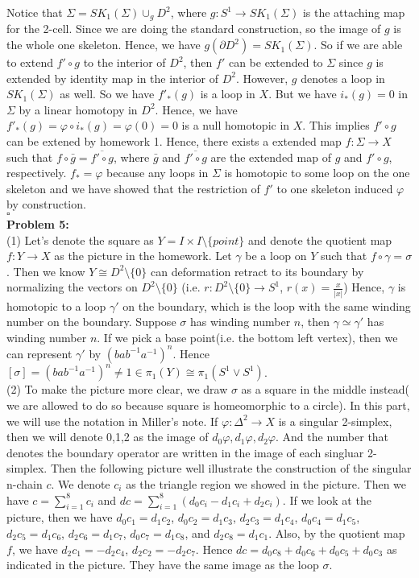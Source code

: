\documentclass[12pt]{amsart}
\begin{document}
Notice that $\Sigma=SK_1(\Sigma)\cup_g D^2$, where $g:S^1\to SK_1(\Sigma)$ is the attaching map for the 2-cell. Since we are doing the standard construction, so the image of $g$ is the whole one skeleton. Hence, we have $g(\partial D^2)=SK_1(\Sigma)$. So if we are able to extend $f'\circ g$ to the interior of $D^2$, then $f'$ can be extended to $\Sigma$ since $g$ is extended by identity map in the interior of $D^2$. However, $g$ denotes a loop in $SK_1(\Sigma)$ as well. So we have $f'_\ast(g)$ is a loop in $X$. But we have $i_\ast(g)=0$ in $\Sigma$ by a linear homotopy in $D^2$. Hence, we have $f'_\ast(g)=\varphi\circ i_\ast(g)=\varphi(0)=0$ is a null homotopic in $X$. This implies $f'\circ g$ can be extened by homework 1. Hence, there exists a extended map $f:\Sigma \to X$ such that $f\circ \bar{g}=\overline{f'\circ g}$, where $\bar{g}$ and $\overline{f'\circ g}$ are the extended map of $g$ and $f'\circ g$, respectively. $f_\ast=\varphi$ because any loops in $\Sigma$ is homotopic to some loop on the one skeleton and we have showed that the restriction of $f'$ to one skeleton induced $\varphi$ by construction.
\\\phantom{qed}\hfill$\square$\\
\textbf{Problem 5:}\\
(1) Let's denote the square as $Y=I\times I \setminus\{point\} $ and denote the quotient map $f:Y\to X$ as the picture in the homework. Let $\gamma$ be a loop on $Y$ such that $f\circ \gamma=\sigma$. Then we know $Y\cong D^2\setminus\{0\}$ can deformation retract to its boundary by normalizing the vectors on $D^2\setminus\{0\}$ (i.e. $r:D^2\setminus\{0\}\to S^1$, $r(x)=\frac{x}{|x|}$) Hence, $\gamma$ is homotopic to a loop $\gamma'$ on the boundary, which is the loop with the same winding number on the boundary. Suppose $\sigma$ has winding number $n$, then $\gamma\simeq\gamma'$ has winding number $n$. If we pick a base point(i.e. the bottom left vertex), then we can represent $\gamma'$ by $(bab^{-1}a^{-1})^n$. Hence $[\sigma]=(bab^{-1}a^{-1})^n\neq 1\in \pi_1(Y)\cong \pi_1(S^1\vee S^1)$.\\
(2) To make the picture more clear, we draw $\sigma$ as a square in the middle instead( we are allowed to do so because square is homeomorphic to a circle). In this part, we will use the notation in Miller's note. If $\varphi:\Delta^2\to X$ is a singular 2-simplex, then we will denote 0,1,2 as the image of $d_0\varphi,d_1\varphi,d_2\varphi$. And the number that denotes the boundary operator are written in the image of each singluar 2-simplex. Then the following picture well illustrate the construction of the singular n-chain $c$. We denote $c_i$ as the triangle region we showed in the picture. Then we have $c=\sum_{i=1}^8 c_i$ and $dc=\sum_{i=1}^8(d_0c_i-d_1c_i+d_2c_i)$. If we look at the picture, then we have $d_0c_1=d_1c_2$, $d_0c_2=d_1c_3$, $d_2c_3=d_1c_4$, $d_0c_4=d_1c_5$, $d_2c_5=d_1c_6$, $d_2c_6=d_1c_7$, $d_0c_7=d_1c_8$, and $d_2c_8=d_1c_1$. Also, by the quotient map $f$, we have $d_2c_1=-d_2c_4$, $d_2c_2=-d_2c_7$. Hence $dc=d_0c_8+d_0c_6+d_0c_5+d_0c_3 $ as indicated in the picture. They have the same image as the loop $\sigma$.\\
\end{document}
